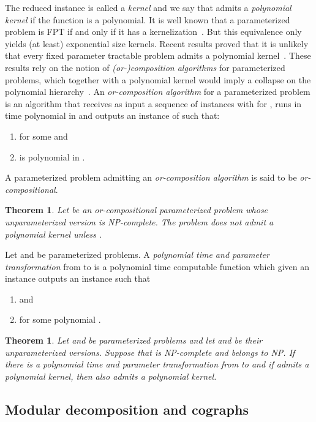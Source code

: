 \documentclass[11pt]{article}
\newtheorem{theorem}[lemma]{Theorem}
\begin{document}
The reduced instance  is called a \emph{kernel} and we say that  admits a \emph{polynomial kernel} if the function  is a polynomial. 
It is well known that a parameterized problem  is FPT if and only if it has a kernelization~\cite{Nie06}. But this equivalence only yields (at least) exponential size kernels. Recent results proved that it is unlikely that every fixed parameter tractable problem admits a polynomial kernel~\cite{BDFH08}. These results rely on the notion of \emph{(or-)composition algorithms} for parameterized problems, which together with a polynomial kernel would imply a collapse on the polynomial hierarchy~\cite{BDFH08}.
An \emph{or-composition algorithm} for a parameterized problem  is an algorithm that receives as input a sequence of instances  with  for , runs in time polynomial in  
and outputs an instance  of  such that:
\begin{enumerate}
\item  for some  and
\item  is polynomial in .
\end{enumerate}

A parameterized problem admitting an \emph{or-composition algorithm} is said to be \emph{or-compositional}.

\begin{theorem}\cite{BDFH08,FS08}\label{th:or-comp}
Let  be an or-compositional parameterized problem whose unparameterized version  is NP-complete. The problem  does not admit a polynomial kernel unless .
\end{theorem}

Let  and  be parameterized problems. A \emph{polynomial time and parameter transformation} from  to  is a polynomial time computable function  which given an instance  outputs an instance  such that 
\begin{enumerate}
\item  and

\item  for some polynomial .
\end{enumerate}

\begin{theorem}\cite{BTY09}\label{th:ppt}
Let  and  be parameterized problems and let  and  be their unparameterized versions. Suppose that  is NP-complete and  belongs to NP. If there is a polynomial time and parameter transformation from  to  and if  admits a polynomial kernel, then  also admits a polynomial kernel.
\end{theorem}

\subsection{Modular decomposition and cographs}
\end{document}
